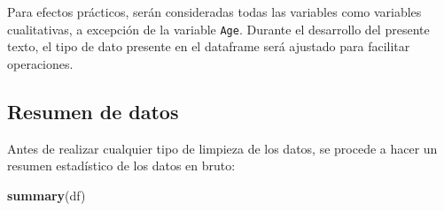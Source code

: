 \documentclass[
  10pt,
  spanish,
]{article}
\newenvironment{Shaded}{\begin{snugshade}}{\end{snugshade}}
\newcommand{\KeywordTok}[1]{\textcolor[rgb]{0.13,0.29,0.53}{\textbf{#1}}}
\newcommand{\NormalTok}[1]{#1}
\begin{document}
Para efectos prácticos, serán consideradas todas las variables como
variables cualitativas, a excepción de la variable \texttt{Age}. Durante
el desarrollo del presente texto, el tipo de dato presente en el
dataframe será ajustado para facilitar operaciones.

\hypertarget{resumen-de-datos}{%
\subsection{Resumen de datos}\label{resumen-de-datos}}

Antes de realizar cualquier tipo de limpieza de los datos, se procede a
hacer un resumen estadístico de los datos en bruto:

\begin{Shaded}
\begin{Highlighting}[]
\KeywordTok{summary}\NormalTok{(df)}
\end{Highlighting}
\end{Shaded}
\end{document}
